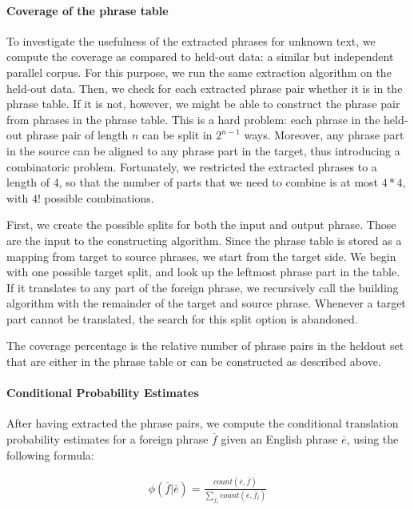 \documentclass[11pt]{article}
\begin{document}
\paragraph{Coverage of the phrase table}
To investigate the usefulness of the extracted phrases for unknown text, we compute the coverage as compared to held-out data: a similar but independent parallel corpus. For this purpose, we run the same extraction algorithm on the held-out data. Then, we check for each extracted phrase pair whether it is in the phrase table. If it is not, however, we might be able to construct the phrase pair from phrases in the phrase table. This is a hard problem: each phrase in the held-out phrase pair of length $n$ can be split in $2^{n-1}$ ways. Moreover, any phrase part in the source can be aligned to any phrase part in the target, thus introducing a combinatoric problem. Fortunately, we restricted the extracted phrases to a length of 4, so that the number of parts that we need to combine is at most $4*4$, with $4!$ possible combinations.


 First, we create the possible splits for both the input and output phrase. Those are the input to the constructing algorithm.
Since the phrase table is stored as a mapping from target to source phrases, we start from the target side. 
We begin with one possible target split, and look up the leftmost phrase part in the table. If it translates to any part of the foreign phrase, we recursively call the building algorithm with the remainder of the target and source phrase. Whenever a target part cannot be translated, the search for this split option is abandoned. 

The coverage percentage is the relative number of phrase pairs in the heldout set that are either in the phrase table or can be constructed as described above.


\paragraph{Conditional Probability Estimates}
After having extracted the phrase pairs, we compute the conditional translation probability estimates for a foreign phrase $\overline{f}$ given an English phrase $\overline{e}$, using the following formula:

\begin{align*}
\phi(\overline{f}|\overline{e}) = \frac{count(\overline{e}, \overline{f})}{\sum_{\overline{f}_i} count(\overline{e},\overline{f}_i)}
\end{align*}
\end{document}
